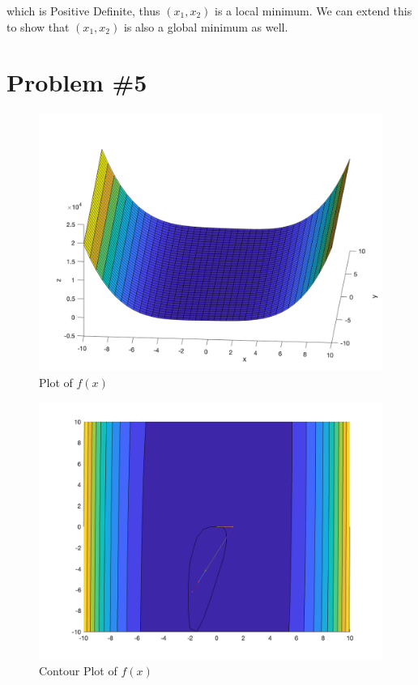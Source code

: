 \documentclass{article}
\begin{document}
which is Positive Definite, thus $(x_1,x_2)$ is a local minimum. We can extend this to show that $(x_1,x_2)$ is also a global minimum as well.

\section*{Problem \#5}

\begin{figure}[H]
    \centering
    \includegraphics[scale=0.3]{fig2.png}
    \caption{Plot of $f(x)$}
    \label{fig:my_label}
\end{figure}

\begin{figure}[H]
    \centering
    \includegraphics[scale=0.3]{fig3.png}
    \caption{Contour Plot of $f(x)$}
    \label{fig:my_label}
\end{figure}
\end{document}
